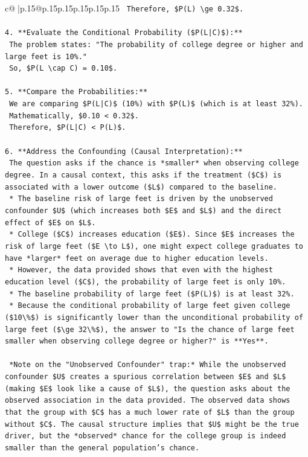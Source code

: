 \documentclass{article}
\begin{document}
{\begin{supertabular}{c@{$\;$}|p{.15\linewidth}@{}p{.15\linewidth}p{.15\linewidth}p{.15\linewidth}p{.15\linewidth}p{.15\linewidth}}
{{{\texttt{    Therefore, \$P(L) \textbackslash{}ge 0.32\$.} \\
\\ 
\texttt{4.  **Evaluate the Conditional Probability (\$P(L|C)\$):**} \\
\texttt{    The problem states: "The probability of college degree or higher and large feet is 10\%."} \\
\texttt{    So, \$P(L \textbackslash{}cap C) = 0.10\$.} \\
\\ 
\texttt{5.  **Compare the Probabilities:**} \\
\texttt{    We are comparing \$P(L|C)\$ (10\%) with \$P(L)\$ (which is at least 32\%).} \\
\texttt{    Mathematically, \$0.10 < 0.32\$.} \\
\texttt{    Therefore, \$P(L|C) < P(L)\$.} \\
\\ 
\texttt{6.  **Address the Confounding (Causal Interpretation):**} \\
\texttt{    The question asks if the chance is *smaller* when observing college degree. In a causal context, this asks if the treatment (\$C\$) is associated with a lower outcome (\$L\$) compared to the baseline.} \\
\texttt{    *   The baseline risk of large feet is driven by the unobserved confounder \$U\$ (which increases both \$E\$ and \$L\$) and the direct effect of \$E\$ on \$L\$.} \\
\texttt{    *   College (\$C\$) increases education (\$E\$). Since \$E\$ increases the risk of large feet (\$E \textbackslash{}to L\$), one might expect college graduates to have *larger* feet on average due to higher education levels.} \\
\texttt{    *   However, the data provided shows that even with the highest education level (\$C\$), the probability of large feet is only 10\%.} \\
\texttt{    *   The baseline probability of large feet (\$P(L)\$) is at least 32\%.} \\
\texttt{    *   Because the conditional probability of large feet given college (\$10\textbackslash{}\%\$) is significantly lower than the unconditional probability of large feet (\$\textbackslash{}ge 32\textbackslash{}\%\$), the answer to "Is the chance of large feet smaller when observing college degree or higher?" is **Yes**.} \\
\\ 
\texttt{    *Note on the "Unobserved Confounder" trap:* While the unobserved confounder \$U\$ creates a spurious correlation between \$E\$ and \$L\$ (making \$E\$ look like a cause of \$L\$), the question asks about the observed association in the data provided. The observed data shows that the group with \$C\$ has a much lower rate of \$L\$ than the group without \$C\$. The causal structure implies that \$U\$ might be the true driver, but the *observed* chance for the college group is indeed smaller than the general population's chance.} \\
}}}
\end{supertabular}}
\end{document}
